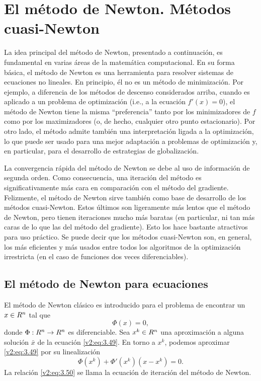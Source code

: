 
\section{El método de Newton. Métodos cuasi-Newton}\label{v2:sec:3.2}

La idea principal del método de Newton, presentado a continuación, es fundamental en varias áreas de la matemática computacional. En su forma básica, el método de Newton es una herramienta para resolver sistemas de ecuaciones no lineales. En principio, él no es un método de minimización. Por ejemplo, a diferencia de los métodos de descenso considerados arriba, cuando es aplicado a un problema de optimización (i.e., a la ecuación $f'(x) = 0$), el método de Newton tiene la misma ``preferencia'' tanto por los minimizadores de $f$ como por los maximizadores (o, de hecho, cualquier otro punto estacionario). Por otro lado, el método admite también una interpretación ligada a la optimización, lo que puede ser usado para una mejor adaptación a problemas de optimización y, en particular, para el desarrollo de estrategias de globalización.

La convergencia rápida del método de Newton se debe al uso de información de segunda orden. Como consecuencia, una iteración del método es significativamente más cara en comparación con el método del gradiente. Felizmente, el método de Newton sirve también como base de desarrollo de los métodos cuasi-Newton. Estos últimos son ligeramente más lentos que el método de Newton, pero tienen iteraciones mucho más baratas (en particular, ni tan más caras de lo que las del método del gradiente). Esto los hace bastante atractivos para uso práctico. Se puede decir que los métodos cuasi-Newton son, en general, los más eficientes y más usados entre todos los algoritmos de la optimización irrestricta (en el caso de funciones dos veces diferenciables).

\subsection{El método de Newton para ecuaciones}\label{v2:sec:3.2.1}

El método de Newton clásico es introducido para el problema de encontrar un $x \in R^n$ tal que
\begin{equation}
    \Phi(x) = 0,
    \label{v2:eq:3.49}
\end{equation}
donde $\Phi : R^n \to R^n$ es diferenciable. Sea $x^k \in R^n$ una aproximación a alguna solución $\bar{x}$ de la ecuación \eqref{v2:eq:3.49}. En torno a $x^k$, podemos aproximar \eqref{v2:eq:3.49} por su linealización
\begin{equation}
    \Phi(x^k) + \Phi'(x^k)(x - x^k) = 0.
    \label{v2:eq:3.50}
\end{equation}
La relación \eqref{v2:eq:3.50} se llama la ecuación de iteración del método de Newton.

